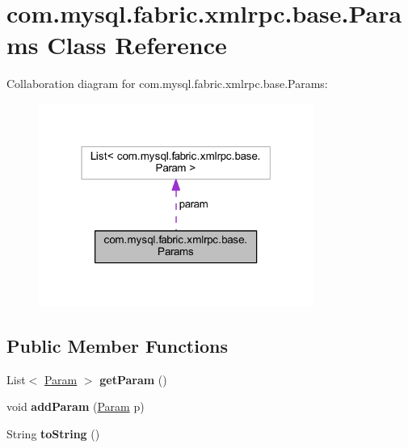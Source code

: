 \hypertarget{classcom_1_1mysql_1_1fabric_1_1xmlrpc_1_1base_1_1_params}{}\section{com.\+mysql.\+fabric.\+xmlrpc.\+base.\+Params Class Reference}
\label{classcom_1_1mysql_1_1fabric_1_1xmlrpc_1_1base_1_1_params}


Collaboration diagram for com.\+mysql.\+fabric.\+xmlrpc.\+base.\+Params\+:\nopagebreak
\begin{figure}[H]
\begin{center}
\leavevmode
\includegraphics[width=255pt]{classcom_1_1mysql_1_1fabric_1_1xmlrpc_1_1base_1_1_params__coll__graph}
\end{center}
\end{figure}
\subsection*{Public Member Functions}
\begin{DoxyCompactItemize}
\item 
\mbox{\label{classcom_1_1mysql_1_1fabric_1_1xmlrpc_1_1base_1_1_params_a2fb825d4c0feafc1395fc60d65435f7e}} 
List$<$ \mbox{\hyperlink{classcom_1_1mysql_1_1fabric_1_1xmlrpc_1_1base_1_1_param}{Param}} $>$ {\bfseries get\+Param} ()
\item 
\mbox{\label{classcom_1_1mysql_1_1fabric_1_1xmlrpc_1_1base_1_1_params_aa1e6089bedaed7b12cfccc075e3695ee}} 
void {\bfseries add\+Param} (\mbox{\hyperlink{classcom_1_1mysql_1_1fabric_1_1xmlrpc_1_1base_1_1_param}{Param}} p)
\item 
\mbox{\label{classcom_1_1mysql_1_1fabric_1_1xmlrpc_1_1base_1_1_params_a99de3c36d74e0b6c9f1b65b8e020dd4b}} 
String {\bfseries to\+String} ()
\end{DoxyCompactItemize}
